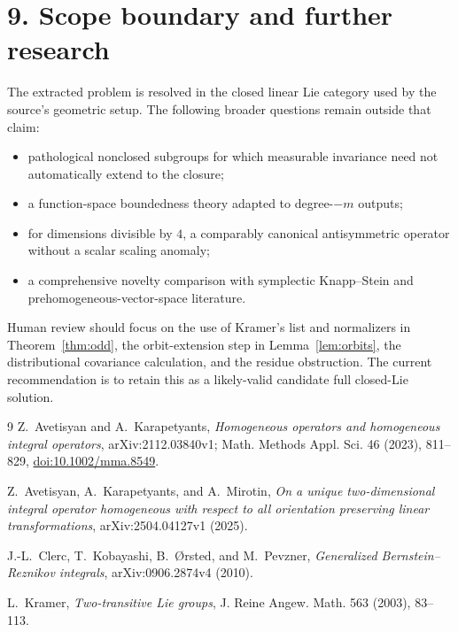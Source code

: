\documentclass[11pt]{article}
\begin{document}
\section*{9. Scope boundary and further research}

The extracted problem is resolved in the closed linear Lie category used by the source's geometric setup.  The following broader questions remain outside that claim:
\begin{itemize}
\item pathological nonclosed subgroups for which measurable invariance need not automatically extend to the closure;
\item a function-space boundedness theory adapted to degree-$-m$ outputs;
\item for dimensions divisible by $4$, a comparably canonical antisymmetric operator without a scalar scaling anomaly;
\item a comprehensive novelty comparison with symplectic Knapp--Stein and prehomogeneous-vector-space literature.
\end{itemize}

Human review should focus on the use of Kramer's list and normalizers in Theorem~\ref{thm:odd}, the orbit-extension step in Lemma~\ref{lem:orbits}, the distributional covariance calculation, and the residue obstruction.  The current recommendation is to retain this as a likely-valid candidate full closed-Lie solution.

\begin{thebibliography}{9}
Z.~Avetisyan and A.~Karapetyants,
\emph{Homogeneous operators and homogeneous integral operators},
arXiv:2112.03840v1; Math. Methods Appl. Sci. 46 (2023), 811--829,
\href{https://doi.org/10.1002/mma.8549}{doi:10.1002/mma.8549}.

Z.~Avetisyan, A.~Karapetyants, and A.~Mirotin,
\emph{On a unique two-dimensional integral operator homogeneous with respect to all orientation preserving linear transformations},
arXiv:2504.04127v1 (2025).

J.-L.~Clerc, T.~Kobayashi, B.~\O rsted, and M.~Pevzner,
\emph{Generalized Bernstein--Reznikov integrals},
arXiv:0906.2874v4 (2010).

L.~Kramer,
\emph{Two-transitive Lie groups},
J. Reine Angew. Math. 563 (2003), 83--113.
\end{thebibliography}
\end{document}
